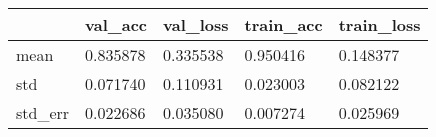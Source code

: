 \begin{tabular}{|l|l|l|l|l|}
\toprule \hline
 & val\_acc & val\_loss & train\_acc & train\_loss \\ \hline
\midrule
mean & 0.835878 & 0.335538 & 0.950416 & 0.148377 \\ \hline
std & 0.071740 & 0.110931 & 0.023003 & 0.082122 \\ \hline
std\_err & 0.022686 & 0.035080 & 0.007274 & 0.025969 \\ \hline
\bottomrule
\end{tabular}
